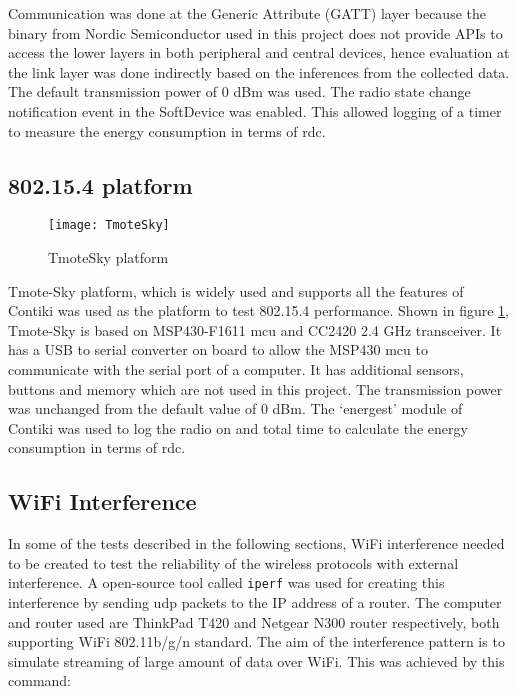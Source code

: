 Communication was done at the Generic Attribute (GATT) layer because the binary from Nordic Semiconductor used in this project does not provide APIs to access the lower layers in both peripheral and central devices, hence evaluation at the link layer was done indirectly based on the inferences from the collected data. The default transmission power of 0 dBm was used. The radio state change notification event in the SoftDevice was enabled. This allowed logging of a timer to measure the energy consumption in terms of \gls{rdc}.

\subsection{802.15.4 platform}

\begin{figure}[h]
    \centering
    \texttt{[image: TmoteSky]}
	\caption{TmoteSky platform}
    \label{fig:TmoteSky}
\end{figure}

Tmote-Sky platform, which is widely used and supports all the features of Contiki was used as the platform to test 802.15.4 performance. Shown in figure \ref{fig:TmoteSky}, Tmote-Sky is based on MSP430-F1611 \gls{mcu} and  CC2420 2.4 GHz transceiver. It has a USB to serial converter on board to allow the MSP430 \gls{mcu} to communicate with the serial port of a computer. It has additional sensors, buttons and memory which are not used in this project. The transmission power was unchanged from the default value of 0 dBm. The `energest' module of Contiki was used to log the radio on and total time to calculate the energy consumption in terms of \gls{rdc}. 



\subsection{WiFi Interference}
In some of the tests described in the following sections, WiFi interference needed to be created to test the reliability of the wireless protocols with external interference. A open-source tool called \texttt{iperf} was used for creating this interference by sending \gls{udp} packets to the IP address of a router. The computer and router used are ThinkPad T420 and Netgear N300 router respectively, both supporting WiFi 802.11b/g/n standard. The aim of the interference pattern is to simulate streaming of large amount of data over WiFi. This was achieved by this command:

